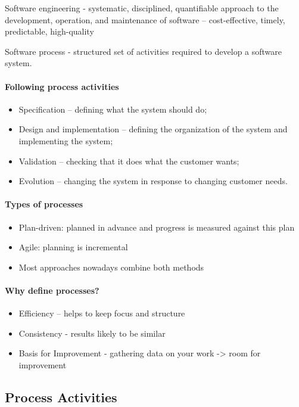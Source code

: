 \documentclass[../ESOF_notes.tex]{subfiles}
\begin{document}
Software engineering - systematic, disciplined, quantifiable approach to the development, operation, and maintenance of software – cost-effective, timely, predictable, high-quality

Software process - structured set of activities required to develop a software system.

\paragraph{Following process activities}
\begin{itemize}
    \item Specification – defining what the system should do;
    \item Design and implementation – defining the organization of the system and implementing the system;
    \item Validation – checking that it does what the customer wants;
    \item Evolution – changing the system in response to changing customer needs.
\end{itemize}

\paragraph{Types of processes}
\begin{itemize}
    \item Plan-driven: planned in advance and progress is measured against this plan
    \item Agile: planning is incremental
    \item Most approaches nowadays combine both methods
\end{itemize}

\paragraph{Why define processes?}
\begin{itemize}
    \item Efficiency – helps to keep focus and structure
    \item Consistency - results likely to be similar
    \item Basis for Improvement - gathering data on your work -> room for improvement
\end{itemize}

\subsection{Process Activities}
\end{document}
